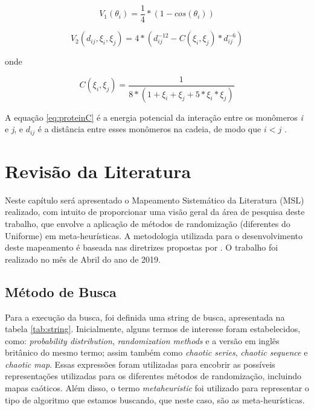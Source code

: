 \begin{equation}
    V_1(\theta_i) = \frac{1}{4} * (1 - cos(\theta_i))
\label{eq:proteinV1}
\end{equation}

\begin{equation}
    V_2(d_{ij}, \xi_i, \xi_j) = 4 * (d_{ij}^{-12} - C(\xi_i, \xi_j) * d_{ij}^{-6})
\label{eq:proteinV2}
\end{equation}

onde 

\begin{equation}
    C(\xi_i, \xi_j) = \frac{1}{8 * (1 + \xi_i + \xi_j + 5 * \xi_i * \xi_j)}
\label{eq:proteinC}
\end{equation}

A equação \ref{eq:proteinC} é a energia potencial da interação entre os monômeros \textit{i} e \textit{j}, e $d_{ij}$ é a distância entre esses monômeros na cadeia, de modo que $i < j$ \cite{parpinelli}.

\chapter{Revisão da Literatura} \label{chap2}

Neste capítulo será apresentado o Mapeamento Sistemático da Literatura (MSL) realizado, com intuito de proporcionar uma visão geral da área de pesquisa deste trabalho, que envolve a aplicação de métodos de randomização (diferentes do Uniforme) em meta-heurísticas. A metodologia utilizada para o desenvolvimento deste mapeamento é baseada nas diretrizes propostas por \cite{petersen}. O trabalho foi realizado no mês de Abril do ano de 2019.

\section{Método de Busca}

Para a execução da busca, foi definida uma string de busca, apresentada na tabela \ref{tab:string}. Inicialmente, alguns termos de interesse foram estabelecidos, como: \textit{probability distribution}, \textit{randomization methods} e a versão em inglês britânico do mesmo termo; assim também como \textit{chaotic series}, \textit{chaotic sequence} e \textit{chaotic map}. Essas expressões foram utilizadas para encobrir as possíveis representações utilizadas para os diferentes métodos de randomização, incluindo mapas caóticos. Além disso, o termo \textit{metaheuristic} foi utilizado para representar o tipo de algoritmo que estamos buscando, que neste caso, são as meta-heurísticas.

